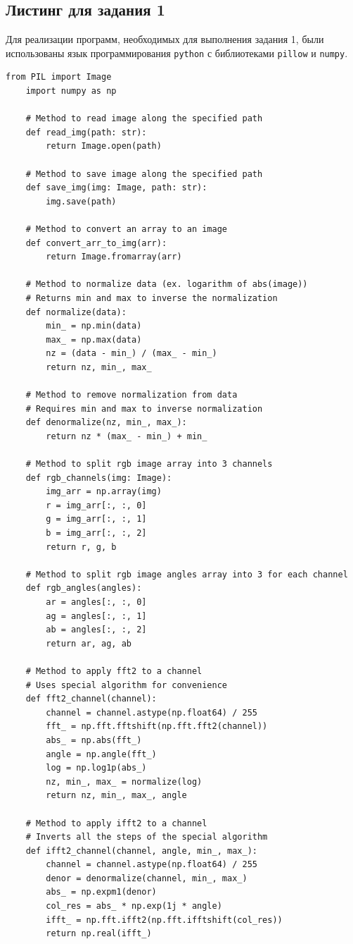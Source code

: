 \documentclass[a4paper, 12pt]{article}
\begin{document}
    \subsection{Листинг для задания 1}
    Для реализации программ, необходимых для выполнения задания 1, были использованы язык программирования
    \texttt{python} с библиотеками \texttt{pillow} и \texttt{numpy}.
    \begin{lstlisting}[label=task1, caption={Программные методы, необходимые для задания 1}]
    from PIL import Image
    import numpy as np

    # Method to read image along the specified path
    def read_img(path: str):
        return Image.open(path)

    # Method to save image along the specified path
    def save_img(img: Image, path: str):
        img.save(path)

    # Method to convert an array to an image
    def convert_arr_to_img(arr):
        return Image.fromarray(arr)

    # Method to normalize data (ex. logarithm of abs(image))
    # Returns min and max to inverse the normalization
    def normalize(data):
        min_ = np.min(data)
        max_ = np.max(data)
        nz = (data - min_) / (max_ - min_)
        return nz, min_, max_
    
    # Method to remove normalization from data
    # Requires min and max to inverse normalization
    def denormalize(nz, min_, max_):
        return nz * (max_ - min_) + min_
    
    # Method to split rgb image array into 3 channels
    def rgb_channels(img: Image):
        img_arr = np.array(img)
        r = img_arr[:, :, 0]
        g = img_arr[:, :, 1]
        b = img_arr[:, :, 2]
        return r, g, b
    
    # Method to split rgb image angles array into 3 for each channel
    def rgb_angles(angles):
        ar = angles[:, :, 0]
        ag = angles[:, :, 1]
        ab = angles[:, :, 2]
        return ar, ag, ab

    # Method to apply fft2 to a channel
    # Uses special algorithm for convenience
    def fft2_channel(channel):
        channel = channel.astype(np.float64) / 255
        fft_ = np.fft.fftshift(np.fft.fft2(channel))
        abs_ = np.abs(fft_)
        angle = np.angle(fft_)
        log = np.log1p(abs_)
        nz, min_, max_ = normalize(log)
        return nz, min_, max_, angle
    
    # Method to apply ifft2 to a channel
    # Inverts all the steps of the special algorithm
    def ifft2_channel(channel, angle, min_, max_):
        channel = channel.astype(np.float64) / 255
        denor = denormalize(channel, min_, max_)
        abs_ = np.expm1(denor)
        col_res = abs_ * np.exp(1j * angle)
        ifft_ = np.fft.ifft2(np.fft.ifftshift(col_res))
        return np.real(ifft_)
    

\end{lstlisting}
\end{document}
